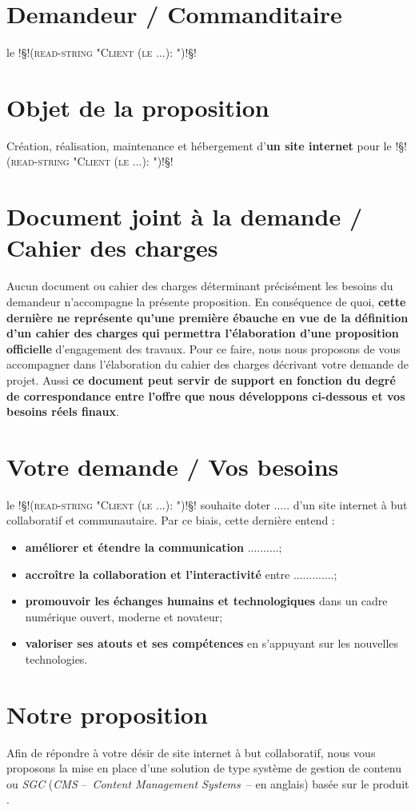 \documentclass[]{extarticle}
\newcommand{\client}{\textsc{!§!(read-string "Client (le ...): ")!§!}}
\newcommand{\leclient}{le \client\xspace}
\begin{document}
\fairetitre

\section{Demandeur \slash{} Commanditaire}
\leclient

\section{Objet de la proposition}
Création, réalisation, maintenance et hébergement d'\textbf{un site internet} pour \leclient

\section{Document joint à la demande \slash{} \og{}Cahier des charges\fg{}}
Aucun document ou \og{}cahier des charges\fg{} déterminant
précisément les besoins du demandeur n'accompagne la présente
proposition. En conséquence de quoi, \textbf{cette dernière ne représente
  qu'une première ébauche en vue de la définition d'un \og{}cahier des
  charges\fg{} qui permettra l'élaboration d'une proposition officielle}
d'engagement des travaux.
Pour ce faire, nous nous proposons de vous accompagner dans
l'élaboration du cahier des charges décrivant votre demande de
projet. Aussi \textbf{ce document peut servir de support en fonction du
  degré de correspondance entre l'offre que nous développons ci-dessous
  et vos besoins réels finaux}.

\section{Votre demande \slash{} Vos besoins}
\leclient souhaite doter .....  d'un site internet à but collaboratif et communautaire.
Par ce biais, cette dernière entend :
\begin{itemize}
\item \textbf{améliorer et étendre la communication} ..........;
\item \textbf{accroître la collaboration et l'interactivité}  entre .............;
\item \textbf{promouvoir les échanges humains et technologiques} dans un cadre numérique
  ouvert, moderne et novateur;
\item \textbf{valoriser ses atouts et ses compétences} en s'appuyant sur les nouvelles technologies.
\end{itemize}

\section{Notre proposition}\label{sec:les-besoins}
Afin de répondre à votre désir de site internet à but collaboratif, nous vous proposons la mise en place
d'une solution de type \og{}système de gestion de contenu\fg{} ou
\textit{SGC} (\textit{CMS} --~\textit{Content Management Systems}~--
en anglais) basée sur le produit \textbf{\typo}.
\end{document}
